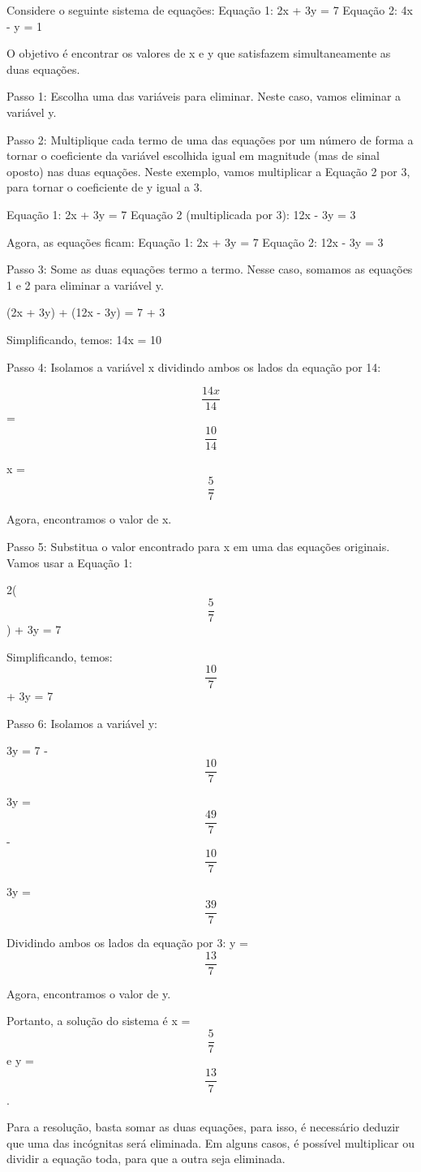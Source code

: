 Considere o seguinte sistema de equações: Equação 1: 2x + 3y = 7 Equação
2: 4x - y = 1

O objetivo é encontrar os valores de x e y que satisfazem
simultaneamente as duas equações.

Passo 1: Escolha uma das variáveis para eliminar. Neste caso, vamos
eliminar a variável y.

Passo 2: Multiplique cada termo de uma das equações por um número de
forma a tornar o coeficiente da variável escolhida igual em magnitude
(mas de sinal oposto) nas duas equações. Neste exemplo, vamos
multiplicar a Equação 2 por 3, para tornar o coeficiente de y igual a 3.

Equação 1: 2x + 3y = 7 Equação 2 (multiplicada por 3): 12x - 3y = 3

Agora, as equações ficam: Equação 1: 2x + 3y = 7 Equação 2: 12x - 3y = 3

Passo 3: Some as duas equações termo a termo. Nesse caso, somamos as
equações 1 e 2 para eliminar a variável y.

(2x + 3y) + (12x - 3y) = 7 + 3

Simplificando, temos: 14x = 10

Passo 4: Isolamos a variável x dividindo ambos os lados da equação por
14:

\[\frac {14x}{14}\] = \[\frac {10}{14}\]

x = \[\frac {5}{7}\]

Agora, encontramos o valor de x.

Passo 5: Substitua o valor encontrado para x em uma das equações
originais. Vamos usar a Equação 1:

2(\[\frac {5}{7}\]) + 3y = 7

Simplificando, temos: \[\frac {10}{7}\] + 3y = 7

Passo 6: Isolamos a variável y:

3y = 7 - \[\frac {10}{7}\]

3y = \[\frac {49}{7}\] - \[\frac {10}{7}\]

3y = \[\frac {39}{7}\]

Dividindo ambos os lados da equação por 3: y = \[\frac {13}{7}\]

Agora, encontramos o valor de y.

Portanto, a solução do sistema é x = \[\frac {5}{7}\] e y =
\[\frac {13}{7}\].

Para a resolução, basta somar as duas equações, para isso, é necessário
deduzir que uma das incógnitas será eliminada. Em alguns casos, é
possível multiplicar ou dividir a equação toda, para que a outra seja
eliminada.

